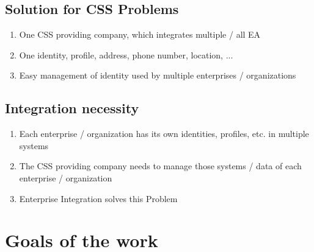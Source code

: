 \documentclass[
     12pt,         %
     a4paper,      %
     BCOR10mm,     %
     DIV14,        %
     ]{scrreprt}
\begin{document}
\subsection{Solution for CSS Problems}
\begin{enumerate}
     \item One CSS providing company, which integrates multiple / all EA
     \item One identity, profile, address, phone number, location, ...
     \item Easy management of identity used by multiple enterprises / organizations
\end{enumerate}

\subsection{Integration necessity}
\begin{enumerate}
     \item Each enterprise / organization has its own identities, profiles, etc. in multiple systems
     \item The CSS providing company needs to manage those systems / data of each enterprise / organization
     \item Enterprise Integration solves this Problem
\end{enumerate}

\section{Goals of the work}
\end{document}
